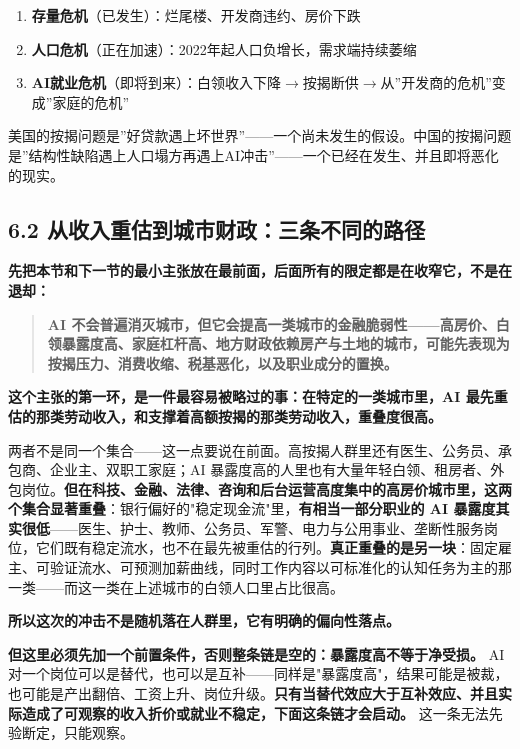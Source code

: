 \documentclass[11pt,a4paper]{ctexart}
\begin{document}
\begin{enumerate}
  \item \textbf{存量危机}（已发生）：烂尾楼、开发商违约、房价下跌
  \item \textbf{人口危机}（正在加速）：2022年起人口负增长，需求端持续萎缩
  \item \textbf{AI就业危机}（即将到来）：白领收入下降$\to$按揭断供$\to$从”开发商的危机”变成”家庭的危机”
\end{enumerate}

美国的按揭问题是”好贷款遇上坏世界”——一个尚未发生的假设。中国的按揭问题是”结构性缺陷遇上人口塌方再遇上AI冲击”——一个已经在发生、并且即将恶化的现实。

\subsection{6.2 从收入重估到城市财政：三条不同的路径}

\textbf{先把本节和下一节的最小主张放在最前面，后面所有的限定都是在收窄它，不是在退却：}

\begin{quote}
\textbf{AI 不会普遍消灭城市，但它会提高一类城市的金融脆弱性——高房价、白领暴露度高、家庭杠杆高、地方财政依赖房产与土地的城市，可能先表现为按揭压力、消费收缩、税基恶化，以及职业成分的置换。}
\end{quote}

\textbf{这个主张的第一环，是一件最容易被略过的事：在特定的一类城市里，AI 最先重估的那类劳动收入，和支撑着高额按揭的那类劳动收入，重叠度很高。}

两者不是同一个集合——这一点要说在前面。高按揭人群里还有医生、公务员、承包商、企业主、双职工家庭；AI 暴露度高的人里也有大量年轻白领、租房者、外包岗位。\textbf{但在科技、金融、法律、咨询和后台运营高度集中的高房价城市里，这两个集合显著重叠}：银行偏好的"稳定现金流"里，\textbf{有相当一部分职业的 AI 暴露度其实很低}——医生、护士、教师、公务员、军警、电力与公用事业、垄断性服务岗位，它们既有稳定流水，也不在最先被重估的行列。\textbf{真正重叠的是另一块}：固定雇主、可验证流水、可预测加薪曲线，同时工作内容以可标准化的认知任务为主的那一类——而这一类在上述城市的白领人口里占比很高。

\textbf{所以这次的冲击不是随机落在人群里，它有明确的偏向性落点。}

\textbf{但这里必须先加一个前置条件，否则整条链是空的：暴露度高不等于净受损。} AI 对一个岗位可以是替代，也可以是互补——同样是"暴露度高"，结果可能是被裁，也可能是产出翻倍、工资上升、岗位升级。\textbf{只有当替代效应大于互补效应、并且实际造成了可观察的收入折价或就业不稳定，下面这条链才会启动。} 这一条无法先验断定，只能观察。
\end{document}
